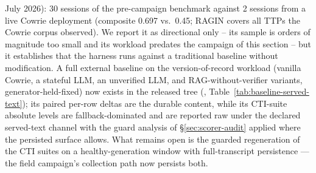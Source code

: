 July 2026): 30 sessions of the pre-campaign benchmark against 2
sessions from a live Cowrie deployment (composite 0.697 vs.\ 0.45;
RAGIN covers all TTPs the Cowrie corpus observed). We report it as
directional only -- its sample is orders of magnitude too small and its
workload predates the campaign of this section -- but it establishes
that the harness runs against a traditional baseline without
modification. A full external baseline on the version-of-record
workload (vanilla Cowrie, a stateful LLM, an unverified LLM, and
RAG-without-verifier variants, generator-held-fixed) now exists in the
released tree (,
Table~\ref{tab:baseline-served-text}); its paired per-row deltas are
the durable content, while its CTI-suite absolute levels are
fallback-dominated and are reported raw under the declared served-text
channel with the guard analysis of \S\ref{sec:scorer-audit} applied
where the persisted surface allows. What remains open is the guarded
regeneration of the CTI suites on a healthy-generation window with
full-transcript persistence --- the field campaign's collection path
now persists both.
